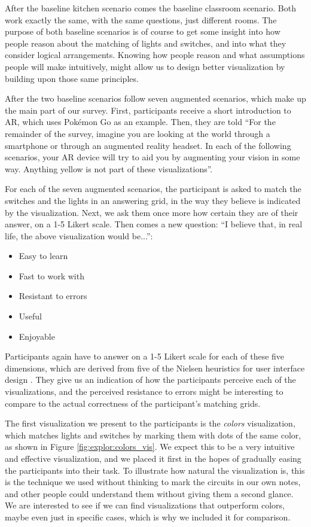 After the baseline kitchen scenario comes the baseline classroom scenario. Both work exactly the same, with the same questions, just different rooms. The purpose of both baseline scenarios is of course to get some insight into how people reason about the matching of lights and switches, and into what they consider logical arrangements. Knowing how people reason and what assumptions people will make intuitively, might allow us to design better visualization by building upon those same principles.

After the two baseline scenarios follow seven augmented scenarios, which make up the main part of our survey.  First, participants receive a short introduction to AR, which uses Pokémon Go as an example. Then, they are told ``For the remainder of the survey, imagine you are looking at the world through a smartphone or through an augmented reality headset. In each of the following scenarios, your AR device will try to aid you by augmenting your vision in some way. Anything yellow is not part of these visualizations''.

For each of the seven augmented scenarios, the participant is asked to match the switches and the lights in an answering grid, in the way they believe is indicated by the visualization. Next, we ask them once more how certain they are of their answer, on a 1-5 Likert scale. Then comes a new question: ``I believe that, in real life, the above visualization would be...'':
\begin{itemize}
    \item Easy to learn
    \item Fast to work with
    \item Resistant to errors
    \item Useful
    \item Enjoyable
\end{itemize}
Participants again have to answer on a 1-5 Likert scale for each of these five dimensions, which are derived from five of the Nielsen heuristics for user interface design \cite{nielsen1990heuristic}. They give us an indication of how the participants perceive each of the visualizations, and the perceived resistance to errors might be interesting to compare to the actual correctness of the participant's matching grids.

The first visualization we present to the participants is the \textit{colors} visualization, which matches lights and switches by marking them with dots of the same color, as shown in Figure \ref{fig:explor:colors_vis}. We expect this to be a very intuitive and effective visualization, and we placed it first in the hopes of gradually easing the participants into their task. To illustrate how natural the visualization is, this is the technique we used without thinking to mark the circuits in our own notes, and other people could understand them without giving them a second glance. We are interested to see if we can find visualizations that outperform colors, maybe even just in specific cases, which is why we included it for comparison.

